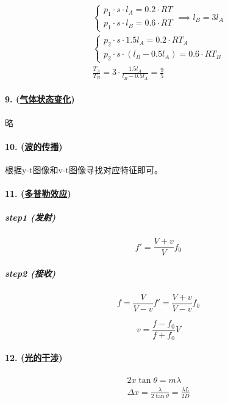 \begin{gather*}
    \begin{cases}
        p_1\cdot s\cdot l_A=0.2\cdot RT\\
        p_1\cdot s\cdot l_B=0.6\cdot RT
    \end{cases}\implies l_B=3l_A\\
    \begin{cases}
        p_2\cdot s\cdot 1.5l_A=0.2\cdot RT_A\\
        p_2\cdot s\cdot (l_B-0.5l_A)=0.6\cdot RT_B
    \end{cases}\\
    \frac{T_A}{T_B}=3\cdot\frac{1.5l_A}{l_B-0.5l_A}=\frac95
\end{gather*}

\paragraph{9. (\hyperref[subsec:气体状态变化]{气体状态变化})} 略
\paragraph{10. (\hyperref[subsec:波的传播]{波的传播})} 根据y-t图像和v-t图像寻找对应特征即可。
\paragraph{11. (\hyperref[subsec:多普勒效应]{多普勒效应})}

\subparagraph{step1 (发射)}

\begin{equation*}
    f'=\frac{V+v}{V}f_0
\end{equation*}

\subparagraph{step2 (接收)}

\begin{equation*}
    f=\frac{V}{V-v}f'=\frac{V+v}{V-v}f_0
\end{equation*}

\begin{equation*}
    v=\frac{f-f_0}{f+f_0}V
\end{equation*}

\paragraph{12. (\hyperref[subsec:光的干涉]{光的干涉})}

\begin{gather*}
    2x\tan\theta=m\lambda\\
    \Delta x=\frac{\lambda}{2\tan\theta}=\frac{\lambda L}{2D}
\end{gather*}

